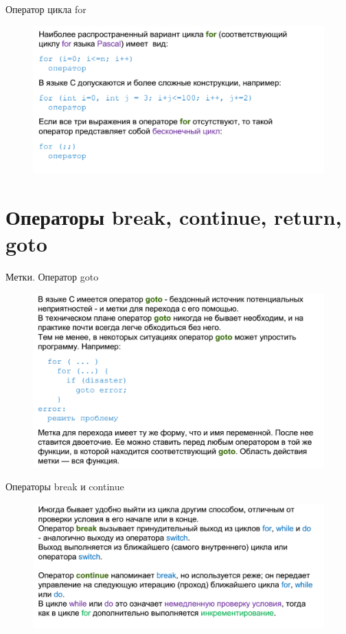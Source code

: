 \documentclass{beamer}
\begin{document}
\begin{frame}{Оператор цикла for}
\begin{figure}[h]
\centering
\includegraphics[scale=0.4]{images/lec02-pic19.png}
\end{figure}
\end{frame}

\section{Операторы break, continue, return, goto}

\begin{frame}{Метки. Оператор goto}
\begin{figure}[h]
\centering
\includegraphics[scale=0.4]{images/lec02-pic20.png}
\end{figure}
\end{frame}

\begin{frame}{Операторы break и continue}
\begin{figure}[h]
\centering
\includegraphics[scale=0.4]{images/lec02-pic21.png}
\end{figure}
\end{frame}
\end{document}
